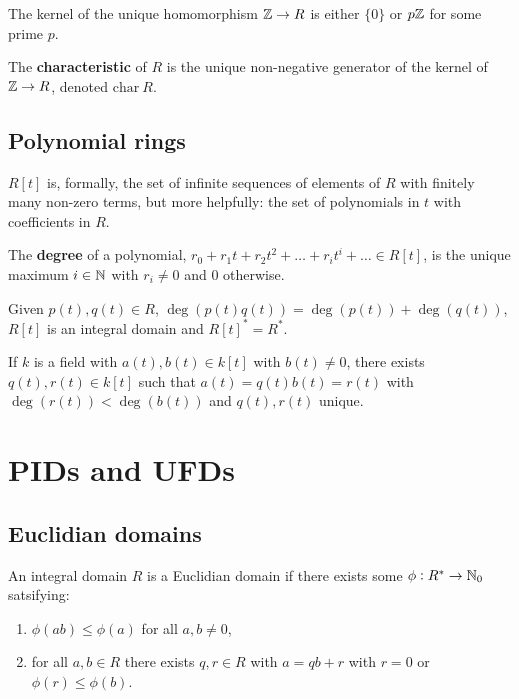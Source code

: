 \documentclass[../Year2.tex]{subfiles}
\begin{document}
\begin{lemma}
    The kernel of the unique homomorphism $\mathbb{Z}\rightarrow R$ is either $\{0\}$ or $p\mathbb{Z}$ for some prime $p$.
\end{lemma}

\begin{definition}[Charateristic]
    The \textbf{characteristic} of $R$ is the unique non-negative generator of the kernel of $\mathbb{Z}\rightarrow R$, denoted $\text{char}\ R$.
\end{definition}

\subsection{Polynomial rings}

\begin{definition}
    $R[t]$ is, formally, the set of infinite sequences of elements of $R$ with finitely many non-zero terms, but more helpfully: the set of polynomials in $t$ with coefficients in $R$.
\end{definition}

\begin{definition}
    The \textbf{degree} of a polynomial, $r_0 + r_1t + r_2t^2 + \ldots + r_i t^i + \ldots \in R[t]$, is the unique maximum $i\in\mathbb{N}$ with $r_i\neq 0$ and $0$ otherwise.
\end{definition}

\begin{lemma}
    Given $p(t),q(t)\in R$, $\deg(p(t)q(t))=\deg(p(t))+\deg(q(t))$, $R[t]$ is an integral domain and $R[t]^* = R^*$.
\end{lemma}

\begin{theorem}
    If $k$ is a field with $a(t),b(t)\in k[t]$ with $b(t)\neq 0$, there exists $q(t),r(t)\in k[t]$ such that $a(t)=q(t)b(t)=r(t)$ with $\deg(r(t))<\deg(b(t))$ and $q(t),r(t)$ unique.
\end{theorem}

\section{PIDs and UFDs}

\subsection{Euclidian domains}

\begin{definition}
    An integral domain $R$ is a Euclidian domain if there exists some  $\phi:R^*\rightarrow\mathbb{N}_0$ satsifying: \begin{enumerate}
        \item $\phi(ab)\leq\phi(a)$ for all $a,b\neq 0$,
        \item for all $a,b\in R$ there exists $q,r\in R$ with $a=qb+r$ with $r=0$ or $\phi(r)\leq\phi(b)$.
    \end{enumerate}
\end{definition}
\end{document}
